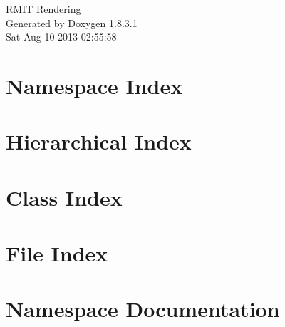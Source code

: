 \documentclass{book}
\begin{document}
\hypersetup{pageanchor=false,citecolor=blue}
\begin{titlepage}
\vspace*{7cm}
\begin{center}
{\Large R\-M\-I\-T Rendering }\\
\vspace*{1cm}
{\large Generated by Doxygen 1.8.3.1}\\
\vspace*{0.5cm}
{\small Sat Aug 10 2013 02:55:58}\\
\end{center}
\end{titlepage}
\clearemptydoublepage
{}
\tableofcontents
\clearemptydoublepage
{}
\hypersetup{pageanchor=true,citecolor=blue}
\chapter{Namespace Index}

\chapter{Hierarchical Index}

\chapter{Class Index}

\chapter{File Index}

\chapter{Namespace Documentation}







\end{document}
